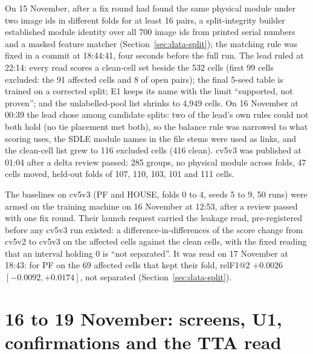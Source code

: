 On 15 November, after a fix round had found the same physical module under two image ids in different folds for at least 16 pairs,
a split-integrity builder established module identity over all 700 image ids from printed serial numbers and a masked feature
matcher (Section~\ref{sec:data-split}); the matching rule was fixed in a commit at 18:44:41, four seconds before the full run. The
lead ruled at 22:14: every read scores a clean-cell set beside the 532 cells (first 99 cells excluded: the 91 affected cells and
8 of open pairs); the final 5-seed table is trained on a corrected split; E1 keeps its name with the limit ``supported, not
proven''; and the unlabelled-pool list shrinks to 4,949 cells. On 16 November at 00:39 the lead chose among candidate splits: two
of the lead's own rules could not both hold (no tie placement met both), so the balance rule was narrowed to what scoring uses, the SDLE
module names in the file stems were used as links, and the clean-cell list grew to 116 excluded cells (416 clean). cv5v3 was
published at 01:04 after a delta review passed: 285 groups, no physical module across folds, 47 cells moved, held-out folds of 107,
110, 103, 101 and 111 cells.

The baselines on cv5v3 (PF and HOUSE, folds 0 to 4, seeds 5 to 9, 50 runs) were armed on the training machine on 16 November at
12:53, after a review passed with one fix round. Their launch request carried the leakage read, pre-registered before any cv5v3 run
existed: a difference-in-differences of the score change from cv5v2 to cv5v3 on the affected cells against the clean cells, with
the fixed reading that an interval holding 0 is ``not separated''. It was read on 17 November at 18:43: for PF on the 69 affected
cells that kept their fold, relF1@2 $+0.0026$ $[-0.0092, +0.0174]$, not separated (Section~\ref{sec:data-split}).

\section{16 to 19 November: screens, U1, confirmations and the TTA read}\label{sec:build-reads}

